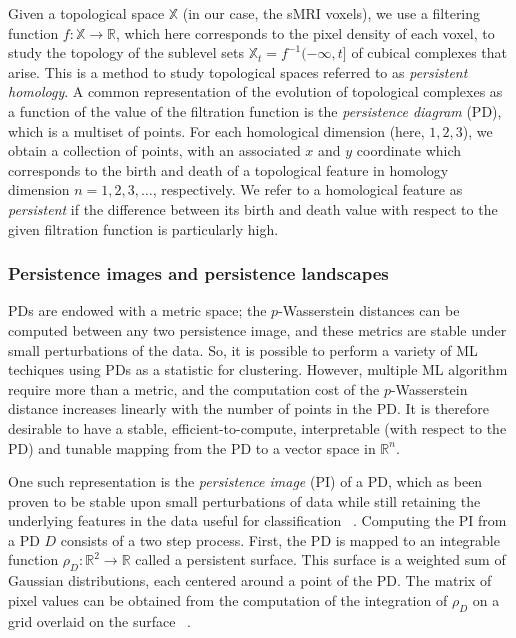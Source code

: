 \documentclass{article}
\begin{document}
Given a topological space $\mathbb{X}$ (in our case, the sMRI voxels), we use a filtering function $f:\mathbb{X}\to\mathbb{R}$, which here corresponds to the pixel density of each voxel, to study the topology of the sublevel sets $\mathbb{X}_t=f^{-1}(-\infty, t]$ of cubical complexes that arise. This is a method to study topological spaces referred to as \emph{persistent homology}. A common representation of the evolution of topological complexes as a function of the value of the filtration function is the \emph{persistence diagram} (PD), which is a multiset of points. For each homological dimension (here, $1,2,3$), we obtain a collection of points, with an associated $x$ and $y$ coordinate which corresponds to the birth and death of a topological feature in homology dimension $n=1,2,3,\ldots$, respectively. We refer to a homological feature as \emph{persistent} if the difference between its birth and death value with respect to the given filtration function is particularly high.


\subsubsection{Persistence images and persistence landscapes}

PDs are endowed with a metric space; the $p$-Wasserstein distances can be computed between any two persistence image, and these metrics are stable under small perturbations of the data. So, it is possible to perform a variety of ML techiques using PDs as a statistic for clustering. However, multiple ML algorithm require more than a metric, and the computation cost of the $p$-Wasserstein distance increases linearly with the number of points in the PD. It is therefore desirable to have a stable, efficient-to-compute, interpretable (with respect to the PD) and tunable mapping from the PD to a vector space in $\mathbb{R}^n$.

One such representation is the \emph{persistence image} (PI) of a PD, which as been proven to be stable upon small perturbations of data while still retaining the underlying features in the data useful for classification ~\citep{adams2017persistence}. Computing the PI from a PD $D$ consists of a two step process. First, the PD is mapped to an integrable function $\rho_D : \mathbb{R}^2\to \mathbb{R}$ called a persistent surface. This surface is a weighted sum of Gaussian distributions, each centered around a point of the PD. The matrix of pixel values can be obtained from the computation of the integration of $\rho_D$ on a grid overlaid on the surface ~\citep{adams2017persistence}.
\end{document}
